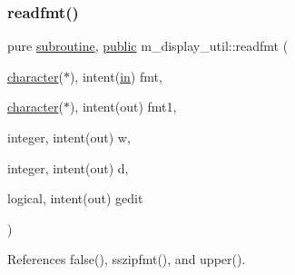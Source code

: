 \subsubsection{\texorpdfstring{readfmt()}{readfmt()}}
{\footnotesize\ttfamily pure \hyperlink{M__stopwatch_83_8txt_acfbcff50169d691ff02d4a123ed70482}{subroutine}, \hyperlink{M__stopwatch_83_8txt_a2f74811300c361e53b430611a7d1769f}{public} m\+\_\+display\+\_\+util\+::readfmt (\begin{DoxyParamCaption}\item[{\hyperlink{option__stopwatch_83_8txt_abd4b21fbbd175834027b5224bfe97e66}{character}($\ast$), intent(\hyperlink{M__journal_83_8txt_afce72651d1eed785a2132bee863b2f38}{in})}]{fmt,  }\item[{\hyperlink{option__stopwatch_83_8txt_abd4b21fbbd175834027b5224bfe97e66}{character}($\ast$), intent(out)}]{fmt1,  }\item[{integer, intent(out)}]{w,  }\item[{integer, intent(out)}]{d,  }\item[{logical, intent(out)}]{gedit }\end{DoxyParamCaption})}



References false(), sszipfmt(), and upper().

